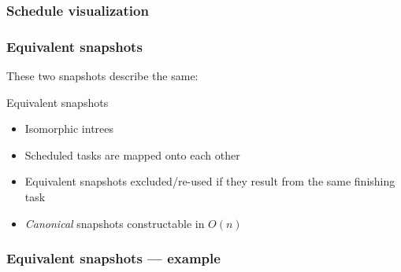 \documentclass{beamer}
\begin{document}
\begin{frame}
  \frametitle{Schedule visualization}
\end{frame}

\begin{frame}
  \frametitle{Equivalent snapshots}
  These two snapshots describe the same:
  \begin{center}
    
    
  \end{center}
  \begin{block}{Equivalent snapshots}
    \begin{itemize}
    \item Isomorphic intrees
    \item Scheduled tasks are mapped onto each other
    \item Equivalent snapshots excluded/re-used if they result from the same finishing task
    \item \emph{Canonical} snapshots constructable in $O(n)$
    \end{itemize}
  \end{block}
\end{frame}

\begin{frame}
  \frametitle{Equivalent snapshots --- example}
  \begin{center}
  \end{center}
\end{frame}
\end{document}
